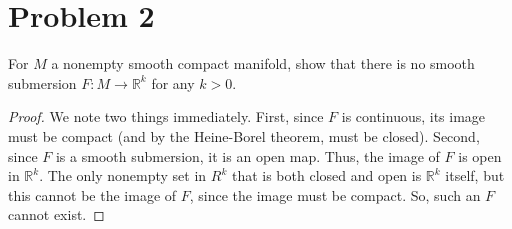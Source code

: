 \documentclass[fontsize=11pt]{scrartcl} %
\numberwithin{equation}{section} %
\numberwithin{figure}{section} %
\numberwithin{table}{section} %
\newcommand{\R}{\mathbb{R}}
\begin{document}
\newpage
\section*{Problem 2} %
For $M$ a nonempty smooth compact manifold, show that there is no
smooth submersion $F:M\to\R^k$ for any $k>0$.
\\
\begin{proof}
We note two things immediately. First, since $F$ is continuous, its image must be compact 
(and by the Heine-Borel theorem, must be closed).
Second, since $F$ is a smooth submersion, it is an open map. Thus, the image of $F$ is open
in $\R^k$. The only nonempty set in $R^k$ that is both closed and open is $\R^k$ itself,
but this cannot be the image of $F$, since the image must be compact. So, such an $F$ cannot
exist.
\end{proof}
\end{document}
